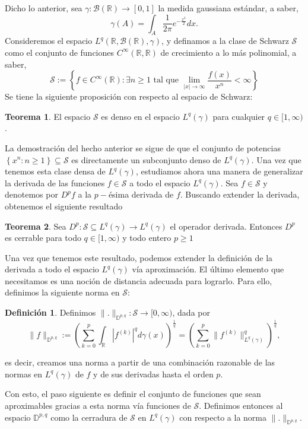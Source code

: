\documentclass[letterpaper,twoside]{book}
\newcommand{\R}{\mathbb{R}}
\newcommand{\B}{\mathcal{B}}
\renewcommand{\S}{\mathcal{S}}
\newcommand{\1}{\mathds{1}}
\renewcommand{\to}{\rightarrow}
\theoremstyle{definition}
\newtheorem{dfn}{Definición}
\theoremstyle{definition}
\newtheorem{teo}{Teorema}
\theoremstyle{definition}
\theoremstyle{definition}
\theoremstyle{definition}
\theoremstyle{definition}
\theoremstyle{definition}
\begin{document}
Dicho lo anterior, sea $\gamma:\B(\R)\to [0,1]$ la medida gaussiana estándar, a saber, 
\[
\gamma(A)=\int_A\frac{1}{2\pi}e^{-\frac{x^2}{2}}dx.    
\]
Consideremos el espacio $L^{q}(\R,\B(\R),\gamma)$, y definamos a la clase de Schwarz $\mathcal{S}$ como el conjunto de funciones $C^{\infty}(\R,\R)$ de crecimiento a lo más polinomial, 
a saber, 
\[
\mathcal{S}:=\left\{f\in C^{\infty}(\R) : \exists n\geq1 \text{ tal que }\lim_{|x|\to\infty}\frac{f(x)}{x^{n}}<\infty \right\}    
\]
Se tiene la siguiente proposición con respecto al espacio de Schwarz:
\begin{teo}
    El espacio $\mathcal{S}$ es denso en el espacio $L^{q}(\gamma)$ para cualquier $q\in [1,\infty)$.
\end{teo}
La demostración del hecho anterior se sigue de que el conjunto de potencias $\left\{x^{n}:n\geq1\right\}\subseteq \mathcal{S}$ es directamente un subconjunto denso de $L^{q}(\gamma)$. Una vez que tenemos esta clase densa de $L^{q}(\gamma)$, estudiamos ahora una manera de generalizar la derivada de las funciones $f\in \mathcal{S}$ a todo el espacio $L^{q}(\gamma)$. Sea $f\in \mathcal{S}$ y denotemos por $D^{p}f$ a la $p-$ésima derivada de $f$. Buscando extender la derivada, obtenemos el siguiente resultado
\begin{teo} 
 Sea $D^{p}:\mathcal{S}\subseteq L^{q}(\gamma)\longrightarrow L^{q}(\gamma)$ el operador derivada. Entonces $D^{p}$ es cerrable para todo $q\in [1,\infty)$ y todo entero $p\geq1$
 \end{teo}
Una vez que tenemos este resultado, podemos extender la definición de la derivada a todo el espacio $L^{q}(\gamma)$ vía aproximación. El último elemento que necesitamos es una noción de distancia adecuada para lograrlo. Para ello, definimos la siguiente norma en $\mathcal{S}$:
\begin{dfn}
    Definimos $\|.\|_{\mathbb{D}^{p,q}}:\mathcal{S}\longrightarrow[0,\infty)$, dada por 
    \[
        \|f\|_{\mathbb{D}^{p,q}}:=\left(\sum_{k=0}^{p}\int_\R|f^{(k)}|^qd\gamma(x)\right)^{\frac{1}{q}}=\left(\sum_{k=0}^{p}\|f^{(k)}\|^q_{L^{q}(\gamma)}\right)^{\frac{1}{q}},
    \]
\end{dfn}
es decir, creamos una norma a partir de una combinación razonable de las normas en $L^{q}(\gamma)$ de $f$ y de sus derivadas hasta el orden $p$.

Con esto, el paso siguiente es definir el conjunto de funciones que sean aproximables gracias a esta norma vía funciones de $\mathcal{S}$. Definimos entonces al espacio $\mathbb{D}^{p,q}$ como la cerradura de $\S$ en $L^{q}(\gamma)$ con respecto a la norma $\|.\|_{\mathbb{D}^{p,q}}$.
\end{document}

